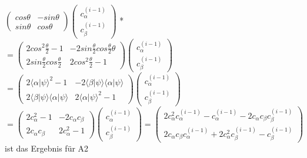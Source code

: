 \documentclass[a4paper]{scrartcl}
\begin{document}
\begin{enumerate}[a)]
$\begin{pmatrix} cos \theta & -sin \theta\\ sin \theta & cos \theta \end{pmatrix} \begin{pmatrix} c_{\alpha}^{(i-1)}\\ c_{\beta}^{(i-1)}\end{pmatrix}$ *\\
$= \begin{pmatrix} 2 cos^2 \frac{\theta}{2}-1 & -2 sin \frac{\theta}{2} cos \frac{\theta}{2} \theta\\ 2 sin \frac{\theta}{2} cos \frac{\theta}{2} & 2 cos^2 \frac{\theta}{2}-1 \end{pmatrix} \begin{pmatrix} c_{\alpha}^{(i-1)}\\ c_{\beta}^{(i-1)}\end{pmatrix}$\\
$= \begin{pmatrix} 2 \langle \alpha | \psi \rangle^2 -1 & -2 \langle \beta | \psi \rangle \langle \alpha | \psi \rangle \\ 2 \langle \beta | \psi \rangle \langle \alpha | \psi \rangle & 2 \langle \alpha | \psi \rangle^2 -1 \end{pmatrix} \begin{pmatrix} c_{\alpha}^{(i-1)}\\ c_{\beta}^{(i-1)}\end{pmatrix}$\\
$= \begin{pmatrix} 2 c_{\alpha}^2 -1 & -2 c_{\alpha}c_{\beta} \\ 2 c_{\alpha}c_{\beta} & 2 c_{\alpha}^2 -1 \end{pmatrix} \begin{pmatrix} c_{\alpha}^{(i-1)}\\ c_{\beta}^{(i-1)}\end{pmatrix}
= \begin{pmatrix} 2c_{\alpha}^2 c_{\alpha}^{(i-1)} -c_{\alpha}^{(i-1)} - 2c_{\alpha}c_{\beta} c_{\beta}^{(i-1)} \\ 2c_{\alpha}c_{\beta} c_{\alpha}^{(i-1)} + 2c_{\alpha}^2 c_{\beta}^{(i-1)} -c_{\beta}^{(i-1)}\end{pmatrix}$ ist das Ergebnis für A2\\


\end{enumerate}
\end{document}
